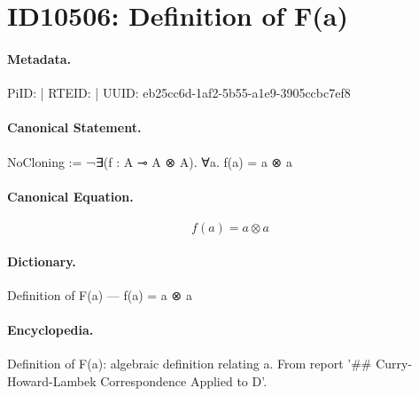 \section*{ID10506: Definition of F(a)}
\paragraph{Metadata.}
PiID:  | RTEID:  | UUID: eb25cc6d-1af2-5b55-a1e9-3905ccbc7ef8

\paragraph{Canonical Statement.}
NoCloning := ¬∃(f : A ⊸ A ⊗ A). ∀a. f(a) = a ⊗ a

\paragraph{Canonical Equation.}
\[
f(a) = a ⊗ a
\]

\paragraph{Dictionary.}
Definition of F(a) — f(a) = a ⊗ a

\paragraph{Encyclopedia.}
Definition of F(a): algebraic definition relating a. From report '\#\# Curry-Howard-Lambek Correspondence Applied to D'.
